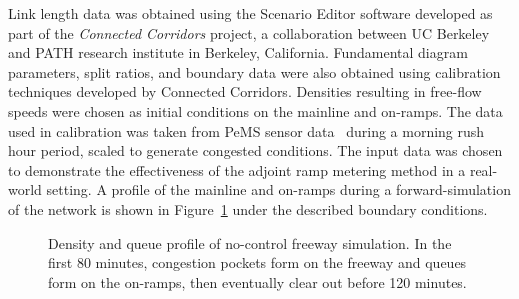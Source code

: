 Link length data was obtained using the Scenario Editor software developed
as part of the \textit{Connected Corridors} project, a collaboration between
UC Berkeley and PATH research institute in Berkeley, California.
Fundamental diagram parameters, split ratios, and boundary data were
also obtained using calibration techniques developed by Connected
Corridors. Densities resulting in free-flow speeds were chosen as
initial conditions on the mainline and on-ramps. The data used in calibration
was taken from PeMS sensor data~\cite{Chen2003} during a morning rush hour period,
scaled to generate congested conditions. The input data was chosen
to demonstrate the effectiveness of the adjoint ramp metering method
in a real-world setting. A profile of the mainline and on-ramps during
a forward-simulation of the network is shown in Figure~\ref{fig:Density-and-queue}
under the described boundary conditions.
\begin{figure}
\hfill{}
								
\caption{Density and queue profile of no-control freeway simulation. In the
	first 80 minutes, congestion pockets form on the freeway and queues
	form on the on-ramps, then eventually clear out before 120 minutes.\label{fig:Density-and-queue}}
\end{figure}
						
						
						
